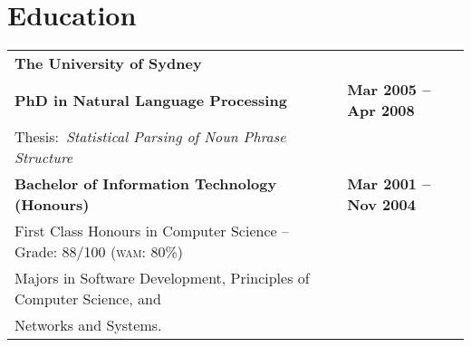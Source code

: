 \documentclass[]{article}
\begin{document}
\vspace{-0.7cm}
\section*{Education}

\setlength{\tabcolsep}{0.1cm}
\begin{table*}[h!]
\begin{tabular}[h!]{p{12.7cm}l}

\textbf{The University of Sydney} & \\
\textbf{PhD in Natural Language Processing} & \textbf{Mar 2005 -- Apr 2008}\\
\hspace{0.5cm}Thesis:~\textit{Statistical Parsing of Noun Phrase Structure} & \\

\textbf{Bachelor of Information Technology (Honours)} & \textbf{Mar 2001 -- Nov 2004}\\
\hspace{0.5cm}First Class Honours in Computer Science -- Grade: 88/100 (\textsc{wam}: 80\%) & \\
\hspace{0.5cm}Majors in Software Development, Principles of Computer Science, and & \\
\hspace{0.5cm}Networks and Systems. & \\


\end{tabular}
\end{table*}
\end{document}
